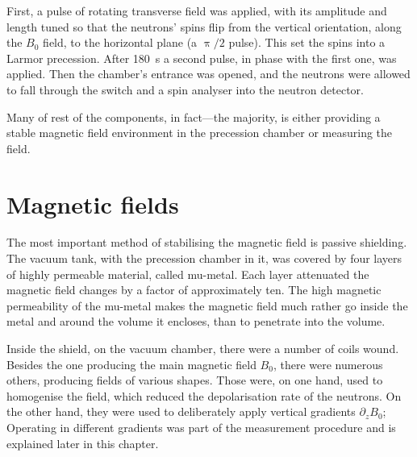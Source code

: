 First, a pulse of rotating transverse field was applied, with its amplitude and length tuned so that the neutrons' spins flip from the vertical orientation, along the $B_0$ field, to the horizontal plane (a $\uppi/2$ pulse).
This set the spins into a Larmor precession.
After \SI{180}{\second} a second pulse, in phase with the first one, was applied. Then the chamber's entrance was opened, and the neutrons were allowed to fall through the switch and a spin analyser into the neutron detector.


Many of rest of the components, in fact---the majority, is either providing a stable magnetic field environment in the precession chamber or measuring the field.




\section{Magnetic fields}
The most important method of stabilising the magnetic field is passive shielding. The vacuum tank, with the precession chamber in it, was covered by four layers of highly permeable material, called mu-metal.
Each layer attenuated the magnetic field changes by a factor of approximately ten. The high magnetic permeability of the mu-metal makes the magnetic field much rather go inside the metal and around the volume it encloses, than to penetrate into the volume. 

Inside the shield, on the vacuum chamber, there were a number of coils wound. 
Besides the one producing the main magnetic field $B_0$, there were numerous others, producing fields of various shapes.
Those were, on one hand, used to homogenise the field, which reduced the depolarisation rate of the neutrons. On the other hand, they were used to deliberately apply vertical gradients $\partial_z B_0$; Operating in different gradients was part of the measurement procedure and is explained later in this chapter.

